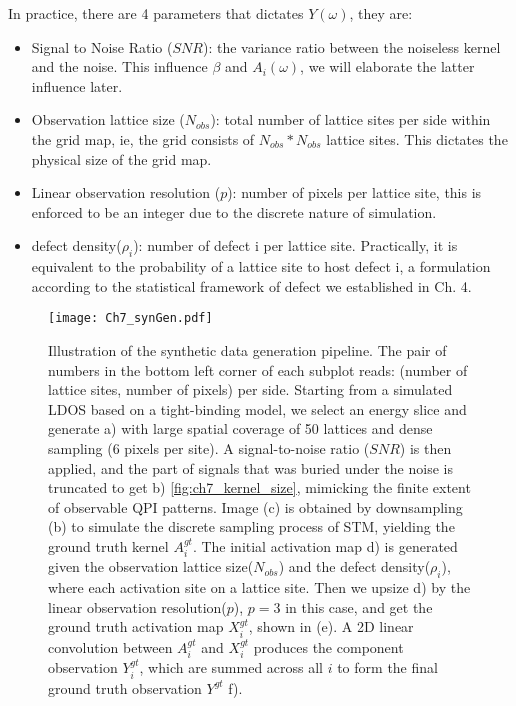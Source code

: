 In practice, there are 4 parameters that dictates $Y(\omega)$, they are:
\begin{itemize}
	\item Signal to Noise Ratio ($SNR$): the variance ratio between the noiseless kernel and the noise. This influence $\beta$ and $A_i(\omega)$, we will elaborate the latter influence later. 
	\item Observation lattice size ($N_{obs}$): total number of lattice sites per side within the grid map, ie, the grid consists of $N_{obs}*N_{obs}$ lattice sites. This dictates the physical size of the grid map. 
	\item Linear observation resolution ($p$): number of pixels per lattice site, this is enforced to be an integer due to the discrete nature of simulation. 
	\item defect density($\rho_i$): number of defect i per lattice site. Practically, it is equivalent to the probability of a lattice site to host defect i, a formulation according to the statistical framework of defect we established in Ch. 4.
\end{itemize}
\begin{figure}
	\texttt{[image: Ch7\_synGen.pdf]} 
	\centering
	\caption{Illustration of the synthetic data generation pipeline. The pair of numbers in the bottom left corner of each subplot reads: (number of lattice sites, number of pixels) per side. Starting from a simulated \ac{LDOS} based on a tight-binding model, we select an energy slice and generate a) with large spatial coverage of 50 lattices and dense sampling (6 pixels per site). A signal-to-noise ratio ($SNR$) is then applied, and the part of signals that was buried under the noise is truncated to get b) \ref{fig:ch7_kernel_size}, mimicking the finite extent of observable \ac{QPI} patterns. Image (c) is obtained by downsampling (b) to simulate the discrete sampling process of \ac{STM}, yielding the ground truth kernel $A^{gt}_i$. The initial activation map d) is generated given the observation lattice size($N_{obs}$) and the defect density($\rho_i$), where each activation site on a lattice site. Then we upsize d) by the linear observation resolution($p$), $p=3$ in this case, and get the ground truth activation map $X^{gt}_i$, shown in (e). A 2D linear convolution between $A^{gt}_i$ and $X^{gt}_i$ produces the component observation $Y^{gt}_i$, which are summed across all $i$ to form the final ground truth observation $Y^{gt}$ f).}
	\label{fig:ch7syn}
\end{figure}

